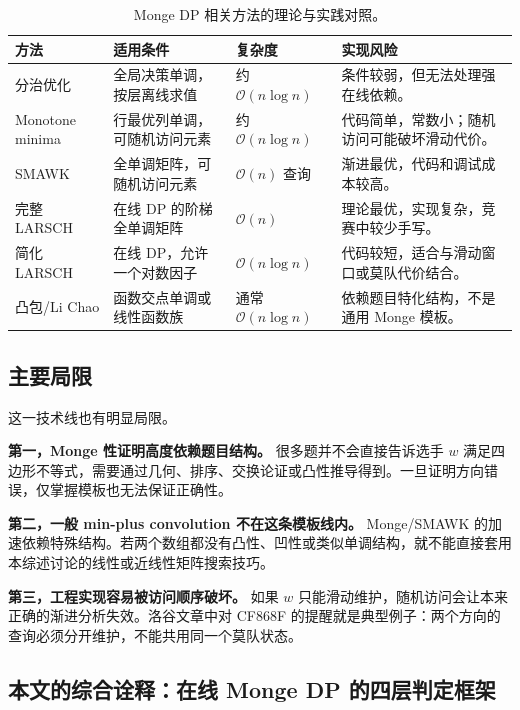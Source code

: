 \documentclass[lang=cn,a4paper,newtx,code=minted,bibtex]{elegantpaper}
\newcommand{\BigO}{\mathcal{O}}
\begin{document}
\begin{table}[htbp]
\centering
\caption{Monge DP 相关方法的理论与实践对照。}
\label{tab:sota-compare}
\begin{tabular}{p{}p{}p{}p{}}
\toprule
方法 & 适用条件 & 复杂度 & 实现风险 \\
\midrule
分治优化 & 全局决策单调，按层离线求值 & 约 $\BigO(n\log n)$ & 条件较弱，但无法处理强在线依赖。 \\
Monotone minima & 行最优列单调，可随机访问元素 & 约 $\BigO(n\log n)$ & 代码简单，常数小；随机访问可能破坏滑动代价。 \\
SMAWK & 全单调矩阵，可随机访问元素 & $\BigO(n)$ 查询 & 渐进最优，代码和调试成本较高。 \\
完整 LARSCH & 在线 DP 的阶梯全单调矩阵 & $\BigO(n)$ & 理论最优，实现复杂，竞赛中较少手写。 \\
简化 LARSCH & 在线 DP，允许一个对数因子 & $\BigO(n\log n)$ & 代码较短，适合与滑动窗口或莫队代价结合。 \\
凸包/Li Chao & 函数交点单调或线性函数族 & 通常 $\BigO(n\log n)$ & 依赖题目特化结构，不是通用 Monge 模板。 \\
\bottomrule
\end{tabular}
\end{table}

\subsection{主要局限}

这一技术线也有明显局限。

\textbf{第一，Monge 性证明高度依赖题目结构。} 很多题并不会直接告诉选手 $w$ 满足四边形不等式，需要通过几何、排序、交换论证或凸性推导得到。一旦证明方向错误，仅掌握模板也无法保证正确性。

\textbf{第二，一般 min-plus convolution 不在这条模板线内。} Monge/SMAWK 的加速依赖特殊结构。若两个数组都没有凸性、凹性或类似单调结构，就不能直接套用本综述讨论的线性或近线性矩阵搜索技巧。

\textbf{第三，工程实现容易被访问顺序破坏。} 如果 $w$ 只能滑动维护，随机访问会让本来正确的渐进分析失效。洛谷文章中对 CF868F 的提醒就是典型例子：两个方向的查询必须分开维护，不能共用同一个莫队状态\cite{luogu2025larsch}。


\subsection{本文的综合诠释：在线 Monge DP 的四层判定框架}
\end{document}
